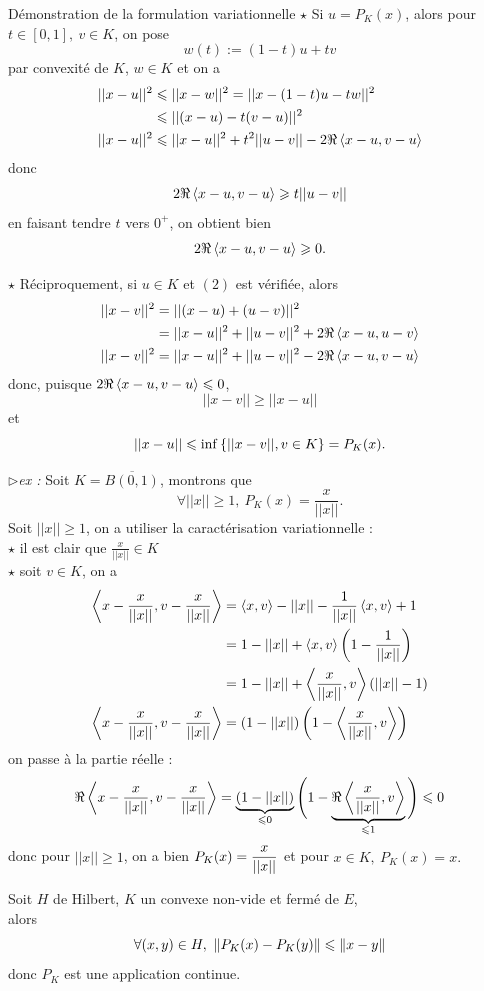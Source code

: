 \documentclass[a4paper,11pt, twoside]{article}
\begin{document}
\begin{ProofC}{Démonstration de la formulation variationnelle}
  $\star$ Si $u=P_K(x)$, alors pour $t\in [0,1],\ v\in K$, on pose 
  $$w(t):=(1-t)u+tv$$
  par convexité de $K$, $w\in K$ et on a 
  \begin{align*}
    ||x-u||^2&\leqslant ||x-w||^2=||x-(1-t)u-tw||^2\\
    &\leqslant ||(x-u)-t(v-u)||^2\\
    ||x-u||^2&\leqslant ||x-u||^2+t^2||u-v||-2\Re\left\langle x-u,v-u \right\rangle
  \end{align*}
  donc 
  $$2\Re \left\langle x-u,v-u \right\rangle\geqslant t||u-v||$$
  en faisant tendre $t$ vers $0^+$, on obtient bien 
  $$2\Re \left\langle x-u,v-u \right\rangle\geqslant 0.$$

  $\star$ Réciproquement, si $u\in K$ et $(\mathit 2)$ est vérifiée, alors 
  \begin{align*}
    ||x-v||^2&=||(x-u)+(u-v)||^2\\
    &=||x-u||^2+||u-v||^2+2\Re\left\langle x-u,u-v \right\rangle\\
    ||x-v||^2&=||x-u||^2+||u-v||^2-2\Re\left\langle x-u,v-u \right\rangle\\
  \end{align*}
  donc, puisque $2\Re\left\langle x-u,v-u \right\rangle\leqslant 0$, 
  $$||x-v||\geqslant ||x-u||$$
  et 
  $$||x-u||\leqslant\mathrm{inf}\left\{||x-v||, v\in K\right\}=P_K(x).$$
\end{ProofC}


$\triangleright$\emph{ex : }Soit $K=\overline{B(0,1)}$, montrons que 
$$\forall ||x||\geqslant 1,\ P_K(x)=\frac{x}{||x||}.$$
Soit $||x||\geqslant 1$, on a utiliser la caractérisation variationnelle :\\

$\star$ il est clair que $\displaystyle\frac{x}{||x||}\in K$\\

$\star$ soit $v\in K$, on a 
\begin{align*}
  \left\langle x-\displaystyle\frac{x}{||x||},v-\displaystyle\frac{x}{||x||} \right\rangle&=\left\langle x,v \right\rangle-||x||-\frac{1}{||x||}\left\langle x,v \right\rangle+1\\
  &=1-||x||+\left\langle x,v \right\rangle\left(1-\frac{1}{||x||}\right)\\
  &=1-||x||+\left\langle \displaystyle\frac{x}{||x||},v \right\rangle\left(||x||-1\right)\\
  \left\langle x-\displaystyle\frac{x}{||x||},v-\displaystyle\frac{x}{||x||} \right\rangle&=\left(1-||x||\right)\left(1-\left\langle \displaystyle\frac{x}{||x||},v \right\rangle\right)
\end{align*}
on passe à la partie réelle :
$$\Re\left\langle x-\displaystyle\frac{x}{||x||},v-\displaystyle\frac{x}{||x||} \right\rangle=\underbrace{\left(1-||x||\right)}_{\leqslant 0}\Bigg(1-\underbrace{\Re\left\langle \displaystyle\frac{x}{||x||},v \right\rangle}_{\leqslant 1}\Bigg)\leqslant 0$$
donc pour $||x||\geqslant 1$, on a bien $P_K(x)=\displaystyle\frac{x}{||x||}$ et pour $x\in K,\ P_K(x)=x.$
\begin{prop}
  Soit $H$ de Hilbert, $K$ un convexe non-vide et fermé de $E$,\\

  alors 
  $$\forall (x,y)\in H,\ \norm{P_K(x)-P_K(y)}\leqslant\norm{x-y}$$
  donc $P_K$ est une application continue.
\end{prop}
\end{document}
